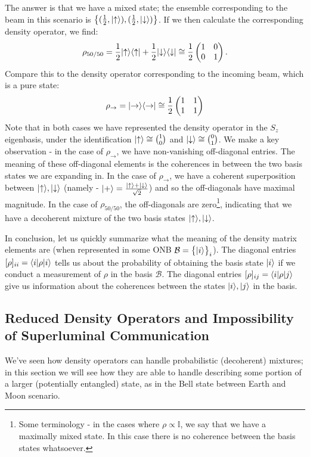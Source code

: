 The answer is that we have a mixed state; the ensemble corresponding to the beam in this scenario is $\set{(\frac{1}{2}, \lvert \uparrow \rangle), (\frac{1}{2}, \lvert \downarrow \rangle)}$. If we then calculate the corresponding density operator, we find:
\begin{equation}
    \rho_{50/50} = \frac{1}{2}\lvert \uparrow \rangle \langle \uparrow \rvert + \frac{1}{2}\lvert \downarrow \rangle \langle \downarrow \rvert \cong \frac{1}{2}\begin{pmatrix}1 & 0 \\ 0 & 1\end{pmatrix}.
\end{equation}
Compare this to the density operator corresponding to the incoming beam, which is a pure state:
\begin{equation}
    \rho_\rightarrow = \lvert \rightarrow \rangle \langle \rightarrow \rvert \cong \frac{1}{2}\begin{pmatrix}1 & 1 \\ 1 & 1\end{pmatrix}
\end{equation}
Note that in both cases we have represented the density operator in the $S_z$ eigenbasis, under the identification $\lvert \uparrow \rangle \cong \binom{1}{0}$ and $\lvert \downarrow \rangle \cong \binom{0}{1}$. We make a key observation - in the case of $\rho_\rightarrow$, we have non-vanishing off-diagonal entries. The meaning of these off-diagonal elements is the coherences in between the two basis states we are expanding in. In the case of $\rho_\rightarrow$, we have a coherent superposition between $\lvert \uparrow \rangle, \lvert \downarrow \rangle$ (namely - $\lvert + \rangle = \frac{\lvert \uparrow \rangle + \lvert \downarrow \rangle}{\sqrt{2}}$) and so the off-diagonals have maximal magnitude. In the  case of $\rho_{50/50}$, the off-diagonals are zero\footnote{Some terminology - in the cases where $\rho \propto \mathbb{I}$, we say that we have a maximally mixed state. In this case there is no coherence between the basis states whatsoever.}, indicating that we have a decoherent mixture of the two basis states $\lvert \uparrow \rangle, \lvert \downarrow \rangle$.

In conclusion, let us quickly summarize what the meaning of the density matrix elements are (when represented in some ONB $\mathcal{B} = \set{\lvert i \rangle}_i$). The diagonal entries $[\rho]_{ii} = \langle i \rvert\rho\lvert i \rangle$ tells us about the probability of obtaining the basis state $\lvert i \rangle$ if we conduct a measurement of $\rho$ in the basis $\mathcal{B}$. The diagonal entries $[\rho]_{ij} = \langle i \rvert\rho\lvert j \rangle$ give us information about the coherences between the states $\lvert i \rangle, \lvert j \rangle$ in the basis.

\subsection{Reduced Density Operators and Impossibility of Superluminal Communication}
We've seen how density operators can handle probabilistic (decoherent) mixtures; in this section we will see how they are able to handle describing some portion of a larger (potentially entangled) state, as in the Bell state between Earth and Moon scenario.

